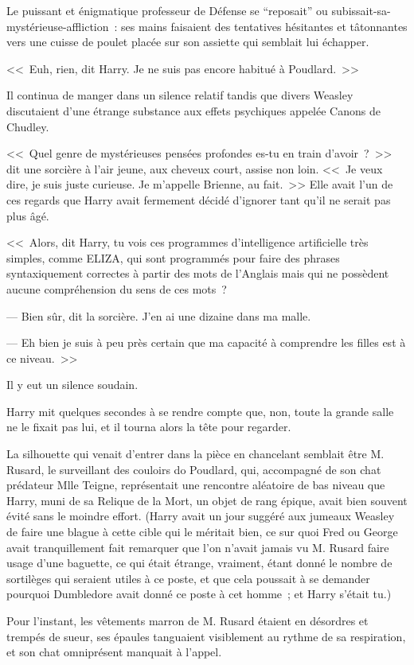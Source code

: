 Le puissant et énigmatique professeur de Défense se “reposait” ou subissait-sa-mystérieuse-affliction~: ses mains faisaient des tentatives hésitantes et tâtonnantes vers une cuisse de poulet placée sur son assiette qui semblait lui échapper.

<<~Euh, rien, dit Harry. Je ne suis pas encore habitué à Poudlard.~>>

Il continua de manger dans un silence relatif tandis que divers Weasley discutaient d'une étrange substance aux effets psychiques appelée Canons de Chudley.

<<~Quel genre de mystérieuses pensées profondes es-tu en train d'avoir~?~>> dit une sorcière à l'air jeune, aux cheveux court, assise non loin. <<~Je veux dire, je suis juste curieuse. Je m'appelle Brienne, au fait.~>> Elle avait l'un de ces regards que Harry avait fermement décidé d'ignorer tant qu'il ne serait pas plus âgé.

<<~Alors, dit Harry, tu vois ces programmes d'intelligence artificielle très simples, comme ELIZA, qui sont programmés pour faire des phrases syntaxiquement correctes à partir des mots de l'Anglais mais qui ne possèdent aucune compréhension du sens de ces mots~?

--- Bien sûr, dit la sorcière. J'en ai une dizaine dans ma malle.

--- Eh bien je suis à peu près certain que ma capacité à comprendre les filles est à ce niveau.~>>

Il y eut un silence soudain.

Harry mit quelques secondes à se rendre compte que, non, toute la grande salle ne le fixait pas lui, et il tourna alors la tête pour regarder.

La silhouette qui venait d'entrer dans la pièce en chancelant semblait être M. Rusard, le surveillant des couloirs do Poudlard, qui, accompagné de son chat prédateur Mlle Teigne, représentait une rencontre aléatoire de bas niveau que Harry, muni de sa Relique de la Mort, un objet de rang épique, avait bien souvent évité sans le moindre effort. (Harry avait un jour suggéré aux jumeaux Weasley de faire une blague à cette cible qui le méritait bien, ce sur quoi Fred ou George avait tranquillement fait remarquer que l'on n'avait jamais vu M. Rusard faire usage d'une baguette, ce qui était étrange, vraiment, étant donné le nombre de sortilèges qui seraient utiles à ce poste, et que cela poussait à se demander pourquoi Dumbledore avait donné ce poste à cet homme~; et Harry s'était tu.)

Pour l'instant, les vêtements marron de M. Rusard étaient en désordres et trempés de sueur, ses épaules tanguaient visiblement au rythme de sa respiration, et son chat omniprésent manquait à l'appel.

